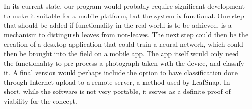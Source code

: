 In its current state, our program would probably require significant development to make it suitable for a mobile platform, but the system is functional. One step that should be added if functionality in the real world is to be achieved, is a mechanism to distinguish leaves from non-leaves. The next step could then be the creation of a desktop application that could train a neural network, which could then be brought into the field on a mobile app. The app itself would only need the functionality to pre-process a photograph taken with the device, and classify it. A final version would perhaps include the option to have classification done through Internet upload to a remote server, a method used by LeafSnap. In short, while the software is not very portable, it serves as a definite proof of viability for the concept.



%
%
%
%
